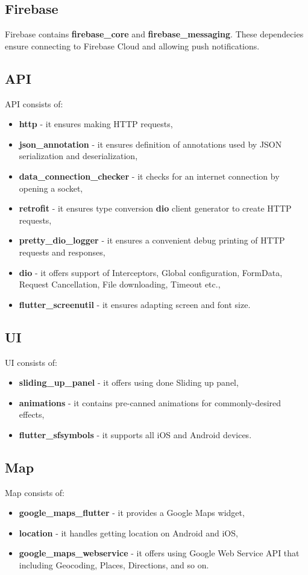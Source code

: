 \subsection{Firebase}\label{subsec:firebase}
Firebase contains \textbf{firebase\_core} and \textbf{firebase\_messaging}.
These dependecies ensure connecting to Firebase Cloud and allowing push notifications.

\subsection{API}\label{subsec:api}
API consists of:
\begin{itemize}
    \item \textbf{http} - it ensures making HTTP requests,
    \item \textbf{json\_annotation} - it ensures definition of annotations used by JSON serialization and deserialization,
    \item \textbf{data\_connection\_checker} - it checks for an internet connection by opening a socket,
    \item \textbf{retrofit} - it ensures type conversion \textbf{dio} client generator to create HTTP requests,
    \item \textbf{pretty\_dio\_logger} - it ensures a convenient debug printing of HTTP requests and responses,
    \item \textbf{dio} - it offers support of Interceptors, Global configuration, FormData, Request Cancellation, File downloading, Timeout etc.,
    \item \textbf{flutter\_screenutil} - it ensures adapting screen and font size.
\end{itemize}

\subsection{UI}\label{subsec:ui}
UI consists of:
\begin{itemize}
    \item \textbf{sliding\_up\_panel} - it offers using done Sliding up panel,
    \item \textbf{animations} - it contains pre-canned animations for commonly-desired effects,
    \item \textbf{flutter\_sfsymbols} - it supports all iOS and Android devices.
\end{itemize}

\subsection{Map}\label{subsec:map}
Map consists of:
\begin{itemize}
    \item \textbf{google\_maps\_flutter} - it provides a Google Maps widget,
    \item \textbf{location} - it handles getting location on Android and iOS,
    \item \textbf{google\_maps\_webservice} - it offers using Google Web Service API that including Geocoding, Places, Directions, and so on.
\end{itemize}

